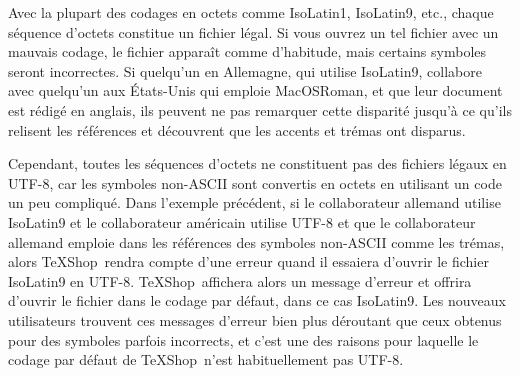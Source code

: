 \documentclass[11pt,french]{article}
\newcommand{\TS}{\textsf{\TeX Shop}}
\newcommand{\acr}[1]{\textsf{#1}}
\begin{document}
Avec la plupart des codages en octets comme \acr{IsoLatin1}, \acr{IsoLatin9}, etc., chaque séquence d'octets constitue un fichier légal. Si vous ouvrez un tel fichier avec un mauvais codage, le fichier apparaît comme d'habitude, mais certains symboles seront incorrectes. Si quelqu'un en Allemagne, qui utilise \acr{IsoLatin9}, collabore avec quelqu'un aux États-Unis qui emploie \acr{MacOSRoman}, et que leur document est rédigé en anglais, ils peuvent ne pas remarquer cette disparité jusqu'à ce qu'ils relisent les références et découvrent que les accents et trémas ont disparus.

Cependant, toutes les séquences d'octets ne constituent pas des fichiers légaux en \acr{UTF-8}, car les symboles non-\acr{ASCII} sont convertis en octets en utilisant un code un peu compliqué. Dans l'exemple précédent, si le collaborateur allemand utilise \acr{IsoLatin9} et le collaborateur américain utilise \mbox{\acr{UTF-8}} et que le collaborateur allemand emploie dans les références des symboles non-\acr{ASCII} comme les trémas, alors \TS\ rendra compte d'une erreur quand il essaiera d'ouvrir le fichier \acr{IsoLatin9} en \acr{UTF-8}. \TS\ affichera alors un message d'erreur et offrira d'ouvrir le fichier dans le codage par défaut, dans ce cas \acr{IsoLatin9}. Les nouveaux utilisateurs trouvent ces messages d'erreur bien plus déroutant que ceux obtenus pour des symboles parfois incorrects, et c'est une des raisons pour laquelle le codage par défaut de \TS\ n'est habituellement pas \acr{UTF-8}.%
\end{document}
